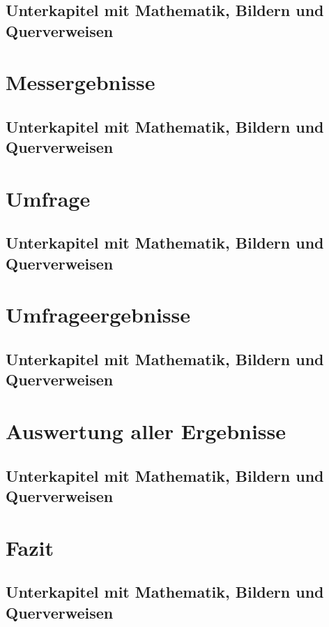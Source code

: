 \section{Unterkapitel mit Mathematik, Bildern und Querverweisen}

\chapter{Messergebnisse}

\section{Unterkapitel mit Mathematik, Bildern und Querverweisen}

\chapter{Umfrage}

\section{Unterkapitel mit Mathematik, Bildern und Querverweisen}

\chapter{Umfrageergebnisse}

\section{Unterkapitel mit Mathematik, Bildern und Querverweisen}

\chapter{Auswertung aller Ergebnisse}

\section{Unterkapitel mit Mathematik, Bildern und Querverweisen}

\chapter{Fazit}

\section{Unterkapitel mit Mathematik, Bildern und Querverweisen}





